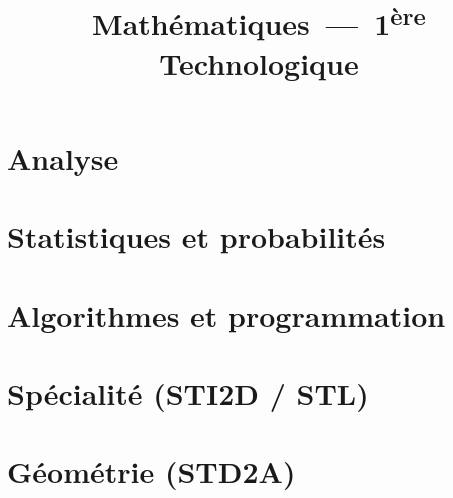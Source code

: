 \documentclass{poly}
\title{Mathématiques~---~1\textsuperscript{ère} Technologique}
\author{}
\date{\figureB{}}
\begin{document}
\maketitle
\tableofcontents
\part{Analyse}







\part{Statistiques et probabilités}






\part{Algorithmes et programmation}

\part{Spécialité (STI2D / STL)}





\part{Géométrie (STD2A)}


\pagenotes
\end{document}
